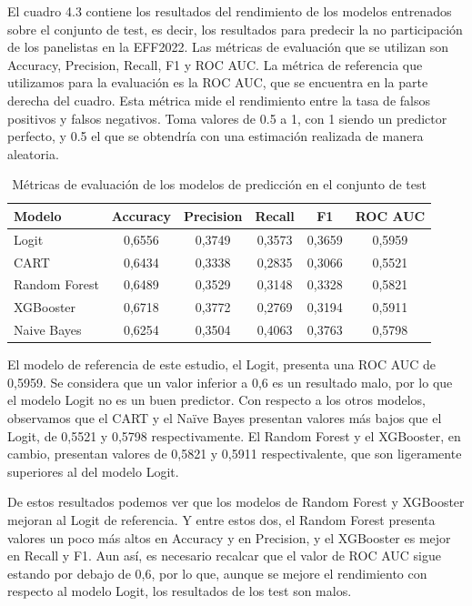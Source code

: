 El cuadro 4.3 contiene los resultados del rendimiento de los modelos entrenados sobre el conjunto de test, es decir, los resultados para predecir la no participación de los panelistas en la EFF2022. Las métricas de evaluación que se utilizan son Accuracy, Precision, Recall, F1 y ROC AUC. La métrica de referencia que utilizamos para la evaluación es la ROC AUC, que se encuentra en la parte derecha del cuadro. Esta métrica mide el rendimiento entre la tasa de falsos positivos y falsos negativos. Toma valores de 0.5 a 1, con 1 siendo un predictor perfecto, y 0.5 el que se obtendría con una estimación realizada de manera aleatoria.

\begin{table}[ht]
    \centering
    \begin{tabular}{lccccc}
    \hline
        \textbf{Modelo} & \textbf{Accuracy} & \textbf{Precision} & \textbf{Recall} & \textbf{F1} & \textbf{ROC AUC} \\ \hline
        Logit & 0,6556 & 0,3749 & 0,3573 & 0,3659 & 0,5959 \\ 
        CART & 0,6434 & 0,3338 & 0,2835 & 0,3066 & 0,5521 \\ 
        Random Forest & 0,6489 & 0,3529 & 0,3148 & 0,3328 & 0,5821 \\ 
        XGBooster & 0,6718 & 0,3772 & 0,2769 & 0,3194 & 0,5911 \\ 
        Naive Bayes & 0,6254 & 0,3504 & 0,4063 & 0,3763 & 0,5798 \\ \hline
    \end{tabular}
    \caption{Métricas de evaluación de los modelos de predicción en el conjunto de test}
\end{table}


El modelo de referencia de este estudio, el Logit, presenta una ROC AUC de 0,5959. Se considera que un valor inferior a 0,6 es un resultado malo, por lo que el modelo Logit no es un buen predictor. Con respecto a los otros modelos, observamos que el CART y el Naïve Bayes presentan valores más bajos que el Logit, de 0,5521 y 0,5798 respectivamente. El Random Forest y el XGBooster, en cambio, presentan valores de 0,5821 y 0,5911 respectivalente, que son ligeramente superiores al del modelo Logit.

De estos resultados podemos ver que los modelos de Random Forest y XGBooster mejoran al Logit de referencia. Y entre estos dos, el Random Forest presenta valores un poco más altos en Accuracy y en Precision, y el XGBooster es mejor en Recall y F1. Aun así, es necesario recalcar que el valor de ROC AUC sigue estando por debajo de 0,6, por lo que, aunque se mejore el rendimiento con respecto al modelo Logit, los resultados de los test son malos.


